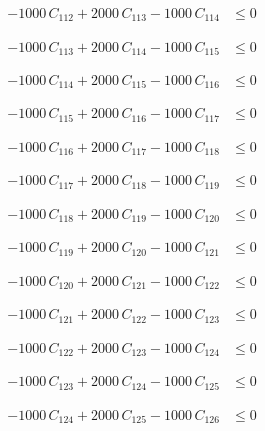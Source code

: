 \documentclass[a4paper,11pt]{article}
\begin{document}
\begin{align}
-1000\,C_{112} + 2000\,C_{113} - 1000\,C_{114} &\leq 0 \nonumber
\end{align}

\begin{align}
-1000\,C_{113} + 2000\,C_{114} - 1000\,C_{115} &\leq 0 \nonumber
\end{align}

\begin{align}
-1000\,C_{114} + 2000\,C_{115} - 1000\,C_{116} &\leq 0 \nonumber
\end{align}

\begin{align}
-1000\,C_{115} + 2000\,C_{116} - 1000\,C_{117} &\leq 0 \nonumber
\end{align}

\begin{align}
-1000\,C_{116} + 2000\,C_{117} - 1000\,C_{118} &\leq 0 \nonumber
\end{align}

\begin{align}
-1000\,C_{117} + 2000\,C_{118} - 1000\,C_{119} &\leq 0 \nonumber
\end{align}

\begin{align}
-1000\,C_{118} + 2000\,C_{119} - 1000\,C_{120} &\leq 0 \nonumber
\end{align}

\begin{align}
-1000\,C_{119} + 2000\,C_{120} - 1000\,C_{121} &\leq 0 \nonumber
\end{align}

\begin{align}
-1000\,C_{120} + 2000\,C_{121} - 1000\,C_{122} &\leq 0 \nonumber
\end{align}

\begin{align}
-1000\,C_{121} + 2000\,C_{122} - 1000\,C_{123} &\leq 0 \nonumber
\end{align}

\begin{align}
-1000\,C_{122} + 2000\,C_{123} - 1000\,C_{124} &\leq 0 \nonumber
\end{align}

\begin{align}
-1000\,C_{123} + 2000\,C_{124} - 1000\,C_{125} &\leq 0 \nonumber
\end{align}

\begin{align}
-1000\,C_{124} + 2000\,C_{125} - 1000\,C_{126} &\leq 0 \nonumber
\end{align}
\end{document}
